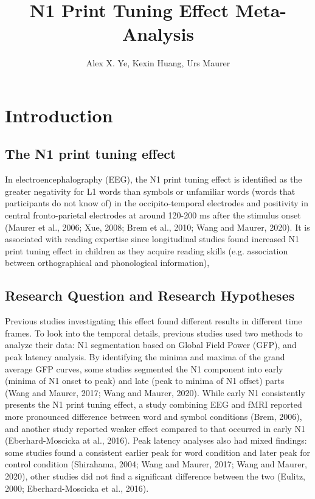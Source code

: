 \documentclass{article}
\title{N1 Print Tuning Effect Meta-Analysis}
\author{Alex X. Ye, Kexin Huang, Urs Maurer}
\begin{document}
\maketitle

\begin{abstract}
\end{abstract}
\section{Introduction}
\subsection{The N1 print tuning effect}

In electroencephalography (EEG), the N1 print tuning effect is identified as the greater negativity for L1 words than symbols or unfamiliar words (words that participants do not know of) in the occipito-temporal electrodes and positivity in central fronto-parietal electrodes at around 120-200 ms after the stimulus onset (Maurer et al., 2006; Xue, 2008; Brem et al., 2010; Wang and Maurer, 2020). It is associated with reading expertise since longitudinal studies found increased N1 print tuning effect in children as they acquire reading skills (e.g. association between orthographical and phonological information), %
\subsection{Research Question and Research Hypotheses}

Previous studies investigating this effect found different results in different time frames. To look into the temporal details, previous studies used two methods to analyze their data: N1 segmentation based on Global Field Power (GFP), and peak latency analysis. By identifying the minima and maxima of the grand average GFP curves, some studies segmented the N1 component into early (minima of N1 onset to peak) and late (peak to minima of N1 offset) parts (Wang and Maurer, 2017; Wang and Maurer, 2020). While early N1 consistently presents the N1 print tuning effect, a study combining EEG and fMRI reported more pronounced difference between word and symbol conditions (Brem, 2006), and another study reported weaker effect compared to that occurred in early N1 (Eberhard-Moscicka at al., 2016). Peak latency analyses also had mixed findings: some studies found a consistent earlier peak for word condition and later peak for control condition (Shirahama, 2004; Wang and Maurer, 2017; Wang and Maurer, 2020), other studies did not find a significant difference between the two (Eulitz, 2000; Eberhard-Moscicka et al., 2016).
 
\end{document}
